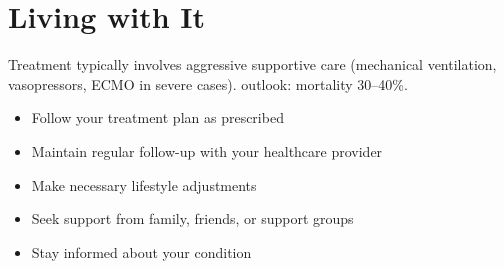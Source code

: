\section{Living with It}
Treatment typically involves aggressive supportive care (mechanical ventilation, vasopressors, ECMO in severe cases). outlook: mortality 30--40\%.

\begin{itemize}[noitemsep]
  \item Follow your treatment plan as prescribed
  \item Maintain regular follow-up with your healthcare provider
  \item Make necessary lifestyle adjustments
  \item Seek support from family, friends, or support groups
  \item Stay informed about your condition
\end{itemize}
